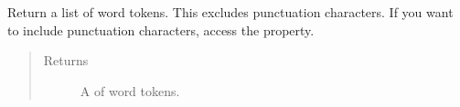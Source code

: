 \documentclass[letterpaper,10pt,english]{sphinxmanual}
\begin{document}
\begin{fulllineitems}
\begin{fulllineitems}
\end{fulllineitems}


\begin{fulllineitems}
\label{api_reference:textblob_de.blob.BaseBlob.words}
Return a list of word tokens. This excludes punctuation characters.
If you want to include punctuation characters, access the 
property.
\begin{quote}\begin{description}
\item[{Returns}] \leavevmode
A {\hyperref[api_reference:textblob_de.blob.WordList]{}} of word tokens.

\end{description}\end{quote}

\end{fulllineitems}


\end{fulllineitems}

\end{document}
